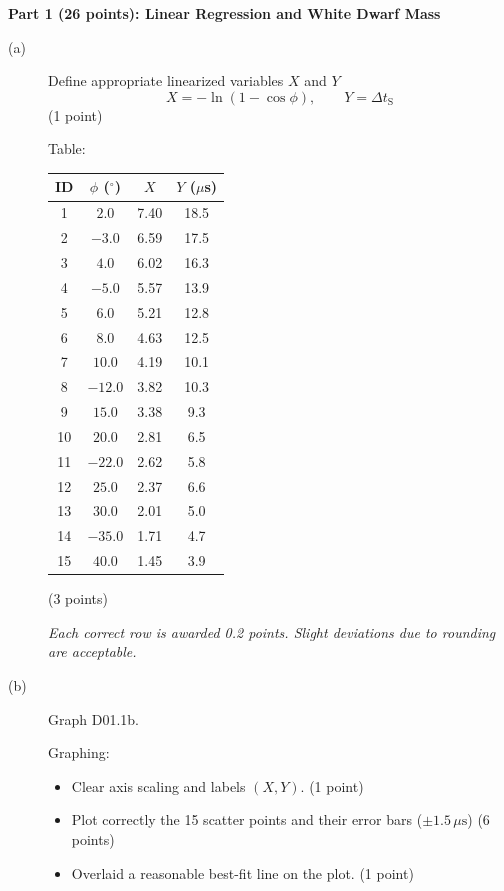 \medskip\noindent\textbf{Part 1 (26 points): Linear Regression and White Dwarf Mass}

\begin{description}
\item[(a)] Define appropriate linearized variables $X$ and $Y$
  \[
  X = -\ln(1 - \cos\phi), \qquad Y = \Delta t_{\mathrm{S}}
  \]
  \hfill(1 point)

  Table:
  \begin{center}
  \begin{tabular}{cccc}
  \toprule
  ID & $\phi$ ($^\circ$) & $X$ & $Y$ ($\mu$s) \\
  \midrule
  1  & $2.0$   & 7.40 & 18.5 \\
  2  & $-3.0$  & 6.59 & 17.5 \\
  3  & $4.0$   & 6.02 & 16.3 \\
  4  & $-5.0$  & 5.57 & 13.9 \\
  5  & $6.0$   & 5.21 & 12.8 \\
  6  & $8.0$   & 4.63 & 12.5 \\
  7  & $10.0$  & 4.19 & 10.1 \\
  8  & $-12.0$ & 3.82 & 10.3 \\
  9  & $15.0$  & 3.38 & 9.3 \\
  10 & $20.0$  & 2.81 & 6.5 \\
  11 & $-22.0$ & 2.62 & 5.8 \\
  12 & $25.0$  & 2.37 & 6.6 \\
  13 & $30.0$  & 2.01 & 5.0 \\
  14 & $-35.0$ & 1.71 & 4.7 \\
  15 & $40.0$  & 1.45 & 3.9 \\
  \bottomrule
  \end{tabular}
  \end{center}
  \hfill(3 points)

  \emph{Each correct row is awarded 0.2 points. Slight deviations due to
  rounding are acceptable.}

\item[(b)]
  Graph D01.1b.

  Graphing:
  \begin{itemize}
  \item Clear axis scaling and labels $(X, Y)$. \hfill(1 point)
  \item Plot correctly the 15 scatter points and their error bars
    ($\pm 1.5\,\mu\mathrm{s}$) \hfill(6 points)
  \item Overlaid a reasonable best-fit line on the plot. \hfill(1 point)
  \end{itemize}


\end{description}
